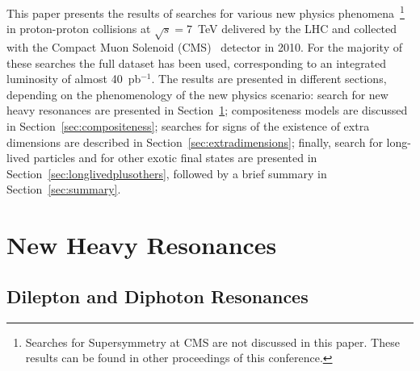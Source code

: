 \documentclass[11pt]{article}
\def\sqrts {$\sqrt{s}=7$~TeV\xspace}
\def\pp{proton-proton\xspace}
\def\pb{pb$^{-1}$\xspace}
\begin{document}
This paper presents the results of searches for various new physics 
phenomena~\footnote{Searches for Supersymmetry at CMS are not 
discussed in this paper. These results can be found in other 
proceedings of this conference.} in \pp collisions 
at \sqrts delivered by the LHC and collected with the 
Compact Muon Solenoid (CMS)~\cite{CMSJINST} detector in 2010. 
For the majority of these searches the full dataset has been used, 
corresponding to an integrated luminosity of almost 40~\pb. 
The results are presented in different sections, 
depending on the phenomenology of the new physics scenario:
search for new heavy resonances are presented in 
Section~\ref{sec:resonances}; compositeness models are discussed 
in Section~\ref{sec:compositeness}; searches for signs of the existence 
of extra dimensions are described in 
Section~\ref{sec:extradimensions}; finally, search for long-lived 
particles and for other exotic final states are presented 
in Section~\ref{sec:longlivedplusothers}, 
followed by a brief summary in Section~\ref{sec:summary}.


\section{New Heavy Resonances}\label{sec:resonances}

\subsection{Dilepton and Diphoton Resonances} \label{sec:dilepdiphotresonances}
\end{document}
